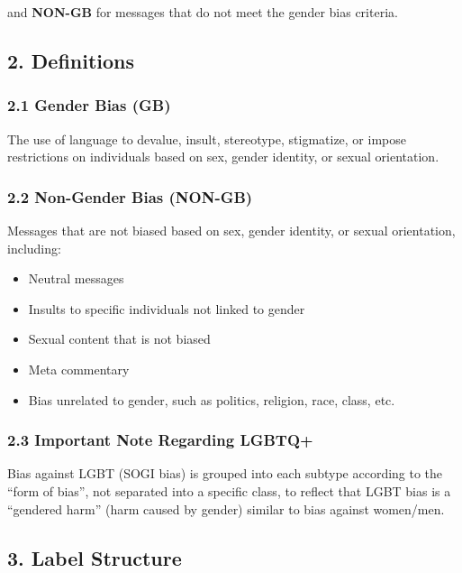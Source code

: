 \documentclass[12pt,oneside,openright,a4paper]{cpe-english-project}
\begin{document}
and \textbf{NON-GB} for messages that do not meet the gender bias
criteria.

\subsection{2. Definitions}\label{definitions}

\subsubsection{2.1 Gender Bias (GB)}\label{gender-bias-gb}

The use of language to devalue, insult, stereotype, stigmatize, or
impose restrictions on individuals based on sex, gender identity, or
sexual orientation.

\subsubsection{2.2 Non-Gender Bias (NON-GB)}\label{non-gender-bias-non-gb}

Messages that are not biased based on sex, gender identity, or sexual
orientation, including:

\begin{itemize}
\setlength{\itemsep}{0.15\baselineskip}
\setlength{\parsep}{0pt}
\setlength{\parskip}{0pt}
\item
  Neutral messages
\item
  Insults to specific individuals not linked to gender
\item
  Sexual content that is not biased
\item
  Meta commentary
\item
  Bias unrelated to gender, such as politics, religion, race, class,
  etc.
\end{itemize}

\subsubsection{2.3 Important Note Regarding LGBTQ+}\label{important-note-regarding-lgbtq}

Bias against LGBT (SOGI bias) is grouped into each subtype according to
the ``form of bias'', not separated into a specific class, to reflect
that LGBT bias is a ``gendered harm'' (harm caused by gender) similar to
bias against women/men.

\subsection{3. Label Structure}\label{label-structure}
\end{document}
